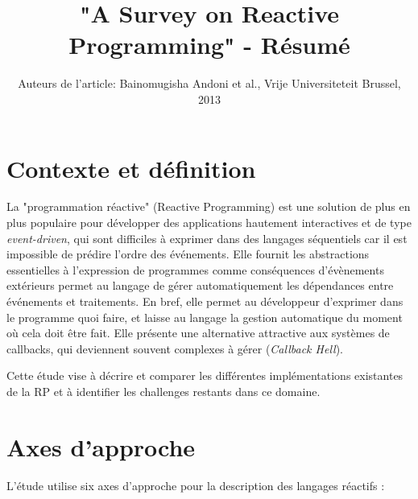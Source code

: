 \documentclass[10pt,final]{IEEEtran}
\begin{document}
\title{"A Survey on Reactive Programming" - Résumé}

\author{Auteurs de l'article: Bainomugisha Andoni et al., Vrije Universiteteit Brussel, 2013}

\maketitle

\section{Contexte et définition}

La "programmation réactive" (Reactive Programming) est une solution de plus en plus populaire pour développer des applications hautement interactives et de type \textit{event-driven}, qui sont difficiles à exprimer dans des langages séquentiels car il est impossible de prédire l'ordre des événements. Elle fournit les abstractions essentielles à l'expression de programmes comme conséquences d'évènements extérieurs permet au langage de gérer automatiquement les dépendances entre événements et traitements. En bref, elle permet au développeur d'exprimer dans le programme quoi faire, et laisse au langage la gestion automatique du moment où cela doit être fait. Elle présente une alternative attractive aux systèmes de callbacks, qui deviennent souvent complexes à gérer (\textit{Callback Hell}).

Cette étude vise à décrire et comparer les différentes implémentations existantes de la RP et à identifier les challenges restants dans ce domaine.


\section{Axes d'approche}
L'étude utilise six axes d'approche pour la description des langages réactifs :
\end{document}
